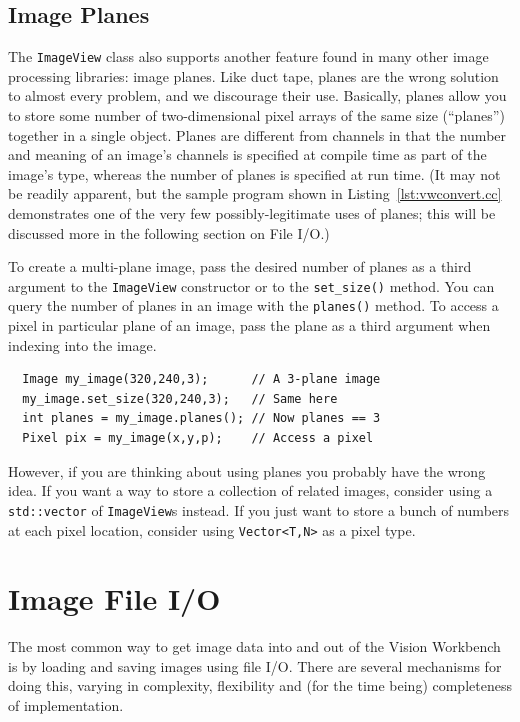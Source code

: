 \subsection{Image Planes}

The \verb#ImageView# class also supports another feature found in many
other image processing libraries: image planes.  Like duct tape,
planes are the wrong solution to almost every problem, and we
discourage their use.  Basically, planes allow you to store some
number of two-dimensional pixel arrays of the same size (``planes'')
together in a single object.  Planes are different from channels in
that the number and meaning of an image's channels is specified at
compile time as part of the image's type, whereas the number of planes
is specified at run time.  (It may not be readily apparent, but the
sample program shown in Listing~\ref{lst:vwconvert.cc} demonstrates
one of the very few possibly-legitimate uses of planes; this will be
discussed more in the following section on File I/O.)

To create a multi-plane image, pass the desired number of planes as a 
third argument to the \verb#ImageView# constructor or to the 
\verb#set_size()# method.  You can query the number of planes in an 
image with the \verb#planes()# method.  To access a pixel in particular 
plane of an image, pass the plane as a third argument when indexing 
into the image.
\begin{verbatim}
  Image my_image(320,240,3);      // A 3-plane image
  my_image.set_size(320,240,3);   // Same here
  int planes = my_image.planes(); // Now planes == 3
  Pixel pix = my_image(x,y,p);    // Access a pixel
\end{verbatim}
However, if you are thinking about using planes you probably have the 
wrong idea.  If you want a way to store a collection of related images, 
consider using a \verb#std::vector# of \verb#ImageView#s instead.  If 
you just want to store a bunch of numbers at each pixel location, 
consider using \verb#Vector<T,N># as a pixel type.

\section{Image File I/O}

The most common way to get image data into and out of the Vision Workbench 
is by loading and saving images using file I/O.  There are several mechanisms 
for doing this, varying in complexity, flexibility and (for the time being) 
completeness of implementation.

